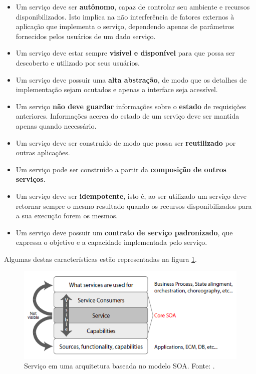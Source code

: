 \begin{itemize}
\item Um serviço deve ser \textbf{autônomo},  capaz de controlar seu ambiente e recursos disponibilizados. Isto implica na não interferência de fatores externos à aplicação que implementa o serviço, dependendo apenas de parâmetros fornecidos pelos usuários de um dado serviço.

\item Um serviço deve estar sempre \textbf{visível e disponível} para que possa ser descoberto e utilizado por seus usuários.

\item Um serviço deve possuir uma \textbf{alta abstração}, de modo que os detalhes de implementação sejam ocutados e apenas a interface seja acessível.

\item Um serviço \textbf{não deve guardar} informações sobre o \textbf{estado} de requisições anteriores. Informações acerca do estado de um serviço deve ser mantida apenas quando necessário.

\item Um serviço deve ser construído de modo que possa ser \textbf{reutilizado} por outras aplicações.

\item Um serviço pode ser construído a partir da \textbf{composição de outros serviços}.

\item Um serviço deve ser \textbf{idempotente}, isto é, ao ser utilizado um serviço deve retornar sempre o mesmo resultado quando os recursos disponibilizados para a sua execução forem os mesmos.

\item Um serviço deve possuir um \textbf{contrato de serviço padronizado}, que expressa o objetivo e a capacidade implementada pelo serviço.
\end{itemize}

Algumas destas características estão representadas na figura \ref{servico_na_arquitetura}.

\begin{figure}[htb]
\centering
\includegraphics[scale=0.8]{figuras/servico_na_arquitetura.png}
\caption{Serviço em uma arquitetura baseada no modelo SOA. Fonte: \cite{nickull_service_2007}.}
\label{servico_na_arquitetura}
\end{figure}

